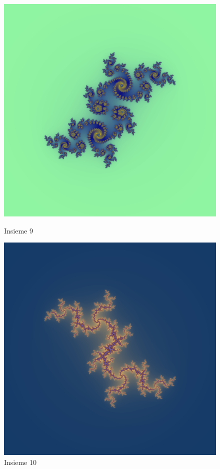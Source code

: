 \documentclass[10pt]{report}
\begin{document}
				\begin{figure}[H]
					\centering
					\includegraphics[width=0.5\linewidth]{"Insieme di Julia/cosa55"}
					\caption*{ \footnotesize{Insieme 9} }
					\label{fig:julia9}
					\endminipage \hfill
					\centering
					\includegraphics[width=0.5\linewidth]{"Insieme di Julia/cosa58"}
					\caption*{ \footnotesize{Insieme 10} }
					\label{fig:julia10}
					\endminipage \hfill
				\end{figure}
\end{document}
